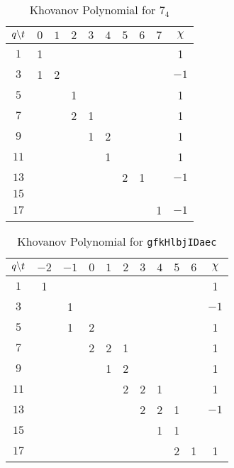     \begin{table}
        \centering
        \begin{tabular}{| c | c | c | c | c | c | c | c | c | c |}
            \hline
            $q\symbol{92}t$&$0$&$1$&$2$&$3$&$4$&$5$&$6$&$7$&$\chi$\\
            \hline
            $1$&1&&&&&&&&1\\
            \hline
            $3$&1&2&&&&&&&$-1$\\
            \hline
            $5$&&&1&&&&&&1\\
            \hline
            $7$&&&2&1&&&&&1\\
            \hline
            $9$&&&&1&2&&&&1\\
            \hline
            $11$&&&&&1&&&&1\\
            \hline
            $13$&&&&&&2&1&&$-1$\\
            \hline
            $15$&&&&&&&&&\\
            \hline
            $17$&&&&&&&&1&$-1$\\
            \hline
        \end{tabular}
        \caption{Khovanov Polynomial for $7_{4}$}
    \end{table}
    \begin{table}
        \centering
        \begin{tabular}{| c | c | c | c | c | c | c | c | c | c | c |}
            \hline
            $q\symbol{92}t$&$-2$&$-1$&$0$&$1$&$2$&$3$&$4$&$5$&$6$&$\chi$\\
            \hline
            $1$&1&&&&&&&&&1\\
            \hline
            $3$&&1&&&&&&&&$-1$\\
            \hline
            $5$&&1&2&&&&&&&1\\
            \hline
            $7$&&&2&2&1&&&&&1\\
            \hline
            $9$&&&&1&2&&&&&1\\
            \hline
            $11$&&&&&2&2&1&&&1\\
            \hline
            $13$&&&&&&2&2&1&&$-1$\\
            \hline
            $15$&&&&&&&1&1&&\\
            \hline
            $17$&&&&&&&&2&1&1\\
            \hline
        \end{tabular}
        \caption{Khovanov Polynomial for \texttt{gfkHlbjIDaec}}
    \end{table}
